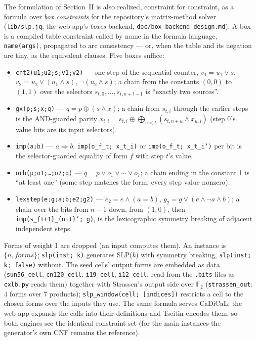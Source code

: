 \documentclass[conference]{IEEEtran}
\providecommand{\F}{\mathbb{F}_2}
\begin{document}
The formulation of Section~II is also realized, constraint for
constraint, as a formula over \emph{box constraints} for the repository's
matrix-method solver (\texttt{lib/slp.jq}; the web app's \emph{boxes}
backend, \texttt{doc/box\_backend\_design.md}). A box is a compiled table
constraint called by name in the formula language, \texttt{name(args)},
propagated to arc consistency --- or, when the table and its negation are
tiny, as the equivalent clauses. Five boxes suffice:
\begin{itemize}
\item \texttt{cnt2(u1;u2;s;v1;v2)} --- one step of the sequential counter,
  $v_1 = u_1 \vee s$, $v_2 = u_2 \vee (u_1 \wedge s)$, $\neg(u_2 \wedge s)$;
  a chain from the constants $(0,0)$ to $(1,1)$ over the selectors
  $s_{t,0},\dots,s_{t,n+t-1}$ is ``exactly two sources''.
\item \texttt{gx(p;s;x;q)} --- $q = p \oplus (s \wedge x)$; a chain from
  $s_{t,i}$ through the earlier steps is the AND-guarded parity
  $x_{t,i} = s_{t,i} \oplus \bigoplus_{u<t}(s_{t,n+u}\wedge x_{u,i})$
  (step 0's value bits are its input selectors).
\item \texttt{imp(a;b)} --- $a \Rightarrow b$; \texttt{imp(o\_f\_t;\,x\_t\_i)}
  or \texttt{imp(o\_f\_t;\,x\_t\_i')} per bit is the selector-guarded
  equality of form $f$ with step $t$'s value.
\item \texttt{orb(p;o1;\ldots;o7;q)} --- $q = p \vee o_1 \vee\cdots\vee o_7$;
  a chain ending in the constant 1 is ``at least one'' (some step matches
  the form; every step value nonzero).
\item \texttt{lexstep(e;g;a;b;e2;g2)} --- $e_2 = e \wedge (a = b)$,
  $g_2 = g \vee (e \wedge \neg a \wedge b)$; a chain over the bits from
  $n{-}1$ down, from $(1,0)$, then
  \texttt{imp(s\_\{t+1\}\_\{n+t\}';\,g)}, is the lexicographic
  symmetry breaking of adjacent independent steps.
\end{itemize}
Forms of weight 1 are dropped (an input computes them). An instance is
$\{n, \mathit{forms}\}$; \texttt{slp(inst; k)} generates SLP($k$) with
symmetry breaking, \texttt{slp(inst; k; false)} without. The seed cells'
output forms are embedded as data (\texttt{sun56\_cell},
\texttt{cn120\_cell}, \texttt{i19\_cell}, \texttt{i12\_cell}, read from
the \texttt{.bits} files as \texttt{cxlb.py} reads them) together with
Strassen's output side over $\F$ (\texttt{strassen\_out}: 4 forms over 7
products); \texttt{slp\_window(cell; [indices])} restricts a cell to the
chosen forms over the inputs they use. The same formula serves CaDiCaL:
the web app expands the calls into their definitions and Tseitin-encodes
them, so both engines see the identical constraint set (for the main
instances the generator's own CNF remains the reference).
\end{document}
